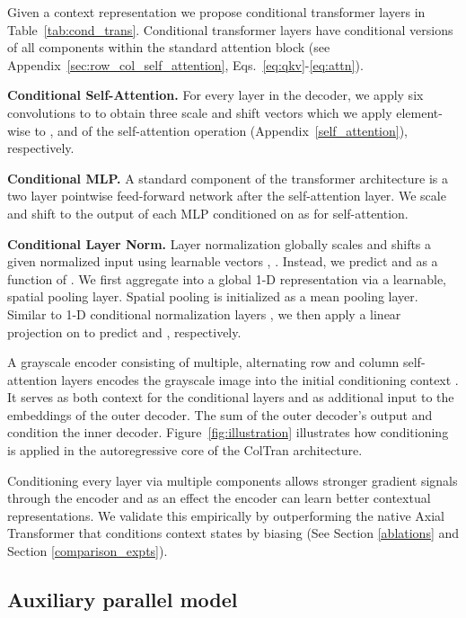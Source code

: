 \documentclass{article} \usepackage{iclr2021_conference,times}
\begin{document}
Given a context representation  we propose conditional transformer layers in Table~\ref{tab:cond_trans}. Conditional transformer layers have conditional versions of all components within the standard attention block (see Appendix~\ref{sec:row_col_self_attention}, Eqs.~\ref{eq:qkv}-\ref{eq:attn}).

\textbf{Conditional Self-Attention.} For every layer in the decoder, we apply six  convolutions to  to obtain three scale and shift vectors which we apply element-wise to ,  and  of the self-attention operation (Appendix~\ref{self_attention}), respectively.

\textbf{Conditional MLP.}
A standard component of the transformer architecture is a two layer pointwise feed-forward network after the self-attention layer. We scale and shift to the output of each MLP conditioned on  as for self-attention.

\textbf{Conditional Layer Norm.}
Layer normalization \citep{ba2016layer} globally scales and shifts a given normalized input using learnable vectors , . Instead, we predict  and  as a function of . We first aggregate  into a global 1-D representation  via a learnable, spatial pooling layer. Spatial pooling is initialized as a mean pooling layer. Similar to 1-D conditional normalization layers \citep{perez2017film, de2017modulating, dumoulin2016learned, huang2017arbitrary}, we then apply a linear projection on  to predict  and , respectively.

A grayscale encoder consisting of multiple, alternating row and column self-attention layers encodes the grayscale image into the initial conditioning context . It serves as both context for the conditional layers and as additional input to the embeddings of the outer decoder. The sum of the outer decoder's output and  condition the inner decoder. Figure~\ref{fig:illustration} illustrates how conditioning is applied in the autoregressive core of the ColTran architecture.

Conditioning every layer via multiple components allows stronger gradient signals through the encoder and as an effect the encoder can learn better contextual representations. We validate this empirically by outperforming the native Axial Transformer that conditions context states by biasing (See Section \ref{ablations} and Section \ref{comparison_expts}).

\subsection{Auxiliary parallel model}
\label{aux_pred_model}
\end{document}
